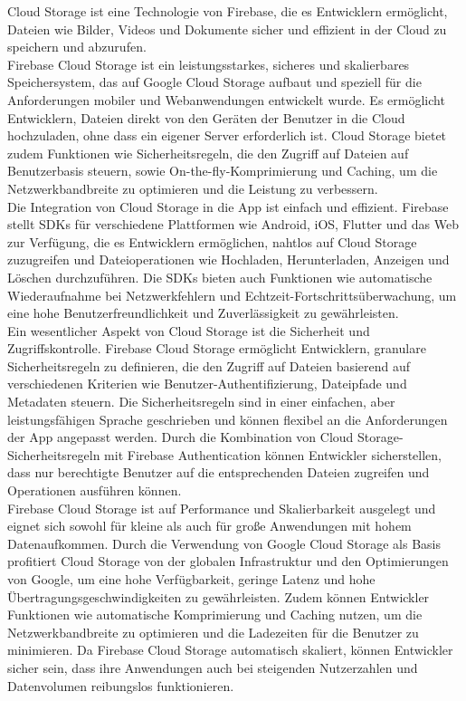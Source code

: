Cloud Storage ist eine Technologie von Firebase, die es Entwicklern ermöglicht, Dateien wie Bilder, Videos und Dokumente sicher und effizient in der Cloud zu speichern und abzurufen.
\\
Firebase Cloud Storage ist ein leistungsstarkes, sicheres und skalierbares Speichersystem, das auf Google Cloud Storage aufbaut und speziell für die Anforderungen mobiler und Webanwendungen entwickelt wurde. Es ermöglicht Entwicklern, Dateien direkt von den Geräten der Benutzer in die Cloud hochzuladen, ohne dass ein eigener Server erforderlich ist. Cloud Storage bietet zudem Funktionen wie Sicherheitsregeln, die den Zugriff auf Dateien auf Benutzerbasis steuern, sowie On-the-fly-Komprimierung und Caching, um die Netzwerkbandbreite zu optimieren und die Leistung zu verbessern.
\\
Die Integration von Cloud Storage in die App ist einfach und effizient. Firebase stellt SDKs für verschiedene Plattformen wie Android, iOS, Flutter und das Web zur Verfügung, die es Entwicklern ermöglichen, nahtlos auf Cloud Storage zuzugreifen und Dateioperationen wie Hochladen, Herunterladen, Anzeigen und Löschen durchzuführen. Die SDKs bieten auch Funktionen wie automatische Wiederaufnahme bei Netzwerkfehlern und Echtzeit-Fortschrittsüberwachung, um eine hohe Benutzerfreundlichkeit und Zuverlässigkeit zu gewährleisten.
\\
Ein wesentlicher Aspekt von Cloud Storage ist die Sicherheit und Zugriffskontrolle. Firebase Cloud Storage ermöglicht Entwicklern, granulare Sicherheitsregeln zu definieren, die den Zugriff auf Dateien basierend auf verschiedenen Kriterien wie Benutzer-Authentifizierung, Dateipfade und Metadaten steuern. Die Sicherheitsregeln sind in einer einfachen, aber leistungsfähigen Sprache geschrieben und können flexibel an die Anforderungen der App angepasst werden. Durch die Kombination von Cloud Storage-Sicherheitsregeln mit Firebase Authentication können Entwickler sicherstellen, dass nur berechtigte Benutzer auf die entsprechenden Dateien zugreifen und Operationen ausführen können.
\\
Firebase Cloud Storage ist auf Performance und Skalierbarkeit ausgelegt und eignet sich sowohl für kleine als auch für große Anwendungen mit hohem Datenaufkommen. Durch die Verwendung von Google Cloud Storage als Basis profitiert Cloud Storage von der globalen Infrastruktur und den Optimierungen von Google, um eine hohe Verfügbarkeit, geringe Latenz und hohe Übertragungsgeschwindigkeiten zu gewährleisten. Zudem können Entwickler Funktionen wie automatische Komprimierung und Caching nutzen, um die Netzwerkbandbreite zu optimieren und die Ladezeiten für die Benutzer zu minimieren. Da Firebase Cloud Storage automatisch skaliert, können Entwickler sicher sein, dass ihre Anwendungen auch bei steigenden Nutzerzahlen und Datenvolumen reibungslos funktionieren.

